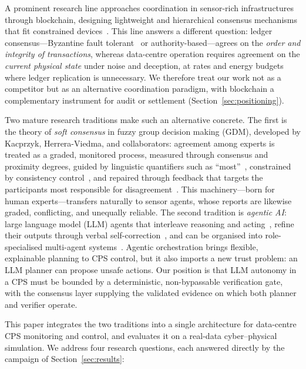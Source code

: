 \documentclass[preprint,11pt]{elsarticle}
\begin{document}
A prominent research line approaches coordination in sensor-rich
infrastructures through blockchain, designing lightweight and
hierarchical consensus mechanisms that fit constrained
devices~\cite{ramachandran2026,haque2024,khan2018,reyna2018,novo2018,
pan2019edgechain,tuli2019fogbus,qu2021pofl}. This line answers a
different question: ledger consensus---Byzantine fault
tolerant~\cite{castro1999} or authority-based---agrees on the
\emph{order and integrity of transactions}, whereas data-centre
operation requires agreement on the \emph{current physical state} under
noise and deception, at rates and energy budgets where ledger
replication is unnecessary. We therefore treat our work not as a
competitor but as an alternative coordination paradigm, with blockchain
a complementary instrument for audit or settlement
(Section~\ref{sec:positioning}).

Two mature research traditions make such an alternative concrete. The
first is the theory of \emph{soft consensus} in fuzzy group decision
making (GDM), developed by Kacprzyk, Herrera-Viedma, and collaborators:
agreement among experts is treated as a graded, monitored process,
measured through consensus and proximity degrees, guided by linguistic
quantifiers such as ``most''~\cite{zadeh1983,yager1988,kacprzyk1986,
kacprzyk1988,kacprzyk1992,herrera1996,herreraviedma2002}, constrained by
consistency control~\cite{herreraviedma2007}, and repaired through
feedback that targets the participants most responsible for
disagreement~\cite{cabrerizo2009,cabrerizo2010soft,cabrerizo2010kbs,
herreraviedma2014}. This machinery---born for human experts---transfers
naturally to sensor agents, whose reports are likewise graded,
conflicting, and unequally reliable. The second tradition is
\emph{agentic AI}: large language model (LLM) agents that interleave
reasoning and acting~\cite{yao2023react}, refine their outputs through
verbal self-correction~\cite{shinn2023reflexion}, and can be organised
into role-specialised multi-agent systems~\cite{wang2024agents}. Agentic
orchestration brings flexible, explainable planning to CPS control, but
it also imports a new trust problem: an LLM planner can propose unsafe
actions. Our position is that LLM autonomy in a CPS must be bounded by
a deterministic, non-bypassable verification gate, with the consensus
layer supplying the validated evidence on which both planner and
verifier operate.

This paper integrates the two traditions into a single architecture for
data-centre CPS monitoring and control, and evaluates it on a real-data
cyber--physical simulation. We address four research questions, each
answered directly by the campaign of Section~\ref{sec:results}:
\end{document}
